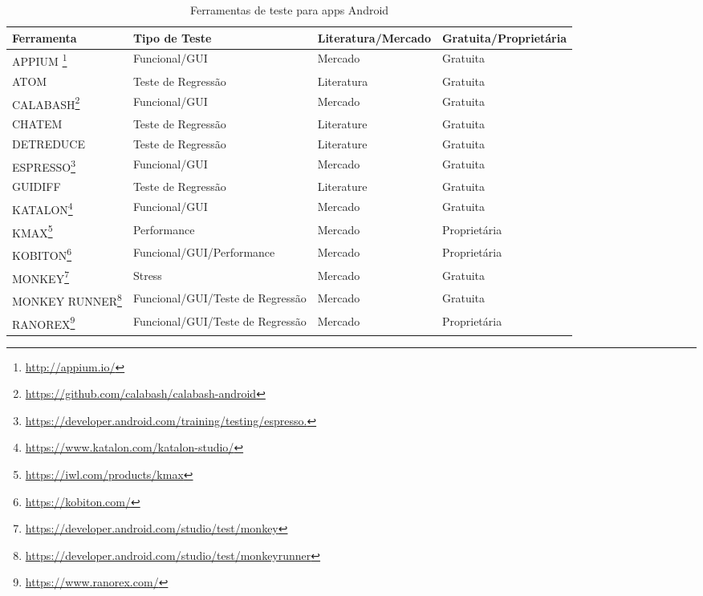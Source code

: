\appendix
{}\label{sec:toolsandroid}


\begin{table}[h!]
\begin{center}
    \scriptsize
    \caption{Ferramentas de teste para apps Android}
    \label{table:androidtools}
    \def \arraystretch{1.2}
    
    \begin{tabular}{m{4cm}m{5cm}m{3cm}m{3cm}}
        \toprule
        \bf Ferramenta & \bf Tipo de Teste & \bf Literatura/Mercado & \bf Gratuita/Proprietária\\ 
        \midrule
        APPIUM \footnote{\url{http://appium.io/}} & Funcional/GUI & Mercado & Gratuita & \\\hline
        ATOM \cite{7927972} & Teste de Regressão & Literatura & Gratuita\\\hline
        CALABASH\footnote{\url{https://github.com/calabash/calabash-android}} & Funcional/GUI & Mercado & Gratuita\\\hline
        CHATEM \cite{8424973} & Teste de Regressão & Literature & Gratuita\\\hline
        DETREDUCE \cite{Choi:2018:DMA:3180155.3180173} & Teste de Regressão & Literature & Gratuita\\\hline
        ESPRESSO\footnote{\url{https://developer.android.com/training/testing/espresso.}} & Funcional/GUI & Mercado & Gratuita\\\hline
        GUIDIFF \cite{6569773} & Teste de Regressão & Literature & Gratuita\\\hline
        KATALON\footnote{\url{https://www.katalon.com/katalon-studio/}} & Funcional/GUI & Mercado & Gratuita\\\hline
        KMAX\footnote{\url{https://iwl.com/products/kmax}} & Performance & Mercado & Proprietária\\\hline
        KOBITON\footnote{\url{https://kobiton.com/}} & Funcional/GUI/Performance & Mercado & Proprietária\\\hline
        MONKEY\footnote{\url{https://developer.android.com/studio/test/monkey}} & Stress & Mercado & Gratuita\\\hline
        MONKEY RUNNER\footnote{\url{https://developer.android.com/studio/test/monkeyrunner}} & Funcional/GUI/Teste de Regressão & Mercado & Gratuita\\\hline
        RANOREX\footnote{\url{https://www.ranorex.com/}} & Funcional/GUI/Teste de Regressão & Mercado & Proprietária\\\hline

\end{tabular}
\end{center}
\end{table}

